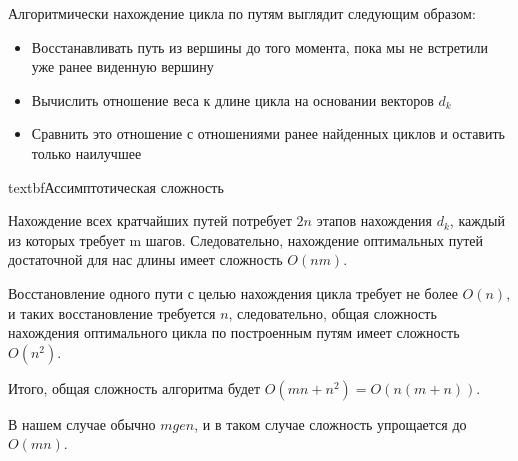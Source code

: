 \documentclass[a4paper,12pt]{article}
\begin{document}
Алгоритмически нахождение цикла по путям выглядит следующим образом:

\begin{itemize}
\item Восстанавливать путь из вершины до того момента, пока мы не встретили уже ранее виденную вершину
\item Вычислить отношение веса к длине цикла на основании векторов $d_k$
\item Сравнить это отношение с отношениями ранее найденных циклов и оставить только наилучшее
\end{itemize}  

textbf{Ассимптотическая сложность}

Нахождение всех кратчайших путей потребует $2n$ этапов нахождения $d_k$, каждый из которых требует m шагов. Следовательно, нахождение оптимальных путей достаточной для нас длины имеет сложность $O(nm)$.

Восстановление одного пути с целью нахождения цикла требует не более $O(n)$, и таких восстановление требуется $n$, следовательно, общая сложность нахождения оптимального цикла по построенным путям имеет сложность $O(n^2)$.

Итого, общая сложность алгоритма будет $O(mn + n^2) = O(n(m+n))$.

В нашем случае обычно $m ge n$, и в таком случае сложность упрощается до $O(mn)$.
\end{document}
